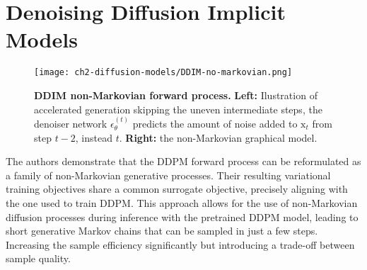 


\section{Denoising Diffusion Implicit Models}\label{sec:DDIM}


\begin{figure}[t]
  \centering
  \texttt{[image: ch2-diffusion-models/DDIM-no-markovian.png]}
  \captionsetup{width=\textwidth} %
  \caption{\textbf{DDIM non-Markovian forward process.} \textbf{Left:} Ilustration of accelerated generation skipping the uneven intermediate steps, the denoiser network $\epsilon_{\theta}^{(t)}$ predicts the amount of noise added to $\mathrm{x}_{t}$ from step $t-2$, instead $t$. \textbf{Right:} the non-Markovian graphical model.}
  \label{fig:ddim-non-markovian}
\end{figure}

The authors demonstrate that the DDPM forward process can be reformulated as a family of non-Markovian generative processes. Their resulting variational training objectives share a common surrogate objective, precisely aligning with the one used to train DDPM. This approach allows for the use of non-Markovian diffusion processes during inference with the pretrained DDPM model, leading to short generative Markov chains that can be sampled in just a few steps. Increasing the sample efficiency significantly but introducing a trade-off between sample quality.

